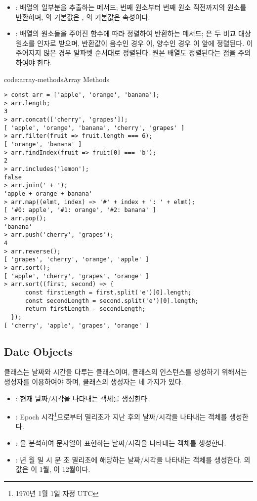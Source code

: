 \begin{itemize}
    \item {}: 배열의 일부분을 추출하는 메서드; 번째 원소부터 번째 원소 직전까지의 원소를 반환하며, 의 기본값은 , 의 기본값은  속성이다.
    \item {}: 배열의 원소들을 주어진 함수에 따라 정렬하여 반환하는 메서드; 은 두 비교 대상 원소를 인자로 받으며, 반환값이 음수인 경우 이, 양수인 경우 이 앞에 정렬된다. 이 주어지지 않은 경우 알파벳 순서대로 정렬된다. 원본 배열도 정렬된다는 점을 주의하여야 한다.
\end{itemize}

\begin{codeenv}{code:array-methods}{Array Methods}\begin{verbatim}
> const arr = ['apple', 'orange', 'banana'];
> arr.length;
3
> arr.concat(['cherry', 'grapes']);
[ 'apple', 'orange', 'banana', 'cherry', 'grapes' ]
> arr.filter(fruit => fruit.length === 6);
[ 'orange', 'banana' ]
> arr.findIndex(fruit => fruit[0] === 'b');
2
> arr.includes('lemon');
false
> arr.join(' + ');
'apple + orange + banana'
> arr.map((elmt, index) => '#' + index + ': ' + elmt);
[ '#0: apple', '#1: orange', '#2: banana' ]
> arr.pop();
'banana'
> arr.push('cherry', 'grapes');
4
> arr.reverse();
[ 'grapes', 'cherry', 'orange', 'apple' ]
> arr.sort();
[ 'apple', 'cherry', 'grapes', 'orange' ]
> arr.sort((first, second) => {
      const firstLength = first.split('e')[0].length;
      const secondLength = second.split('e')[0].length;
      return firstLength - secondLength;
  });
[ 'cherry', 'apple', 'grapes', 'orange' ]
\end{verbatim}
\end{codeenv}
\newpage

\subsection*{Date Objects}

 클래스는 날짜와 시간을 다루는 클래스이며,  클래스의 인스턴스를 생성하기 위해서는 생성자를 이용하여야 하며,  클래스의 생성자는 네 가지가 있다.

\begin{itemize}
    \item {}: 현재 날짜/시각을 나타내는  객체를 생성한다.
    \item {}: Epoch 시각\footnote{1970년 1월 1일 자정 UTC}으로부터 밀리초가 지난 후의 날짜/시각을 나타내는  객체를 생성한다.
    \item {}: 을 분석하여 문자열이 표현하는 날짜/시각을 나타내는  객체를 생성한다.
    \item {}: 년 월 일 시 분 초  밀리초에 해당하는 날짜/시각을 나타내는  객체를 생성한다. 의 값은 이 1월, 이 12월이다.
\end{itemize}

